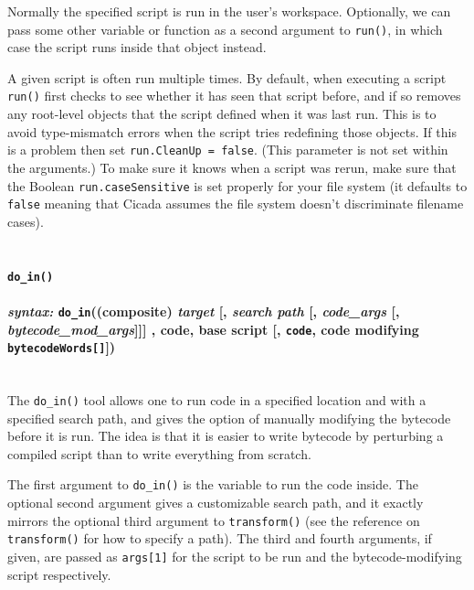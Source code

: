 \documentclass{article}
\begin{document}
Normally the specified script is run in the user's workspace.  Optionally, we can pass some other variable or function as a second argument to \texttt{run()}, in which case the script runs inside that object instead.

A given script is often run multiple times.  By default, when executing a script \verb#run()# first checks to see whether it has seen that script before, and if so removes any root-level objects that the script defined when it was last run.  This is to avoid type-mismatch errors when the script tries redefining those objects.  If this is a problem then set \verb#run.CleanUp = false#.  (This parameter is not set within the arguments.)  To make sure it knows when a script was rerun, make sure that the Boolean \verb#run.caseSensitive# is set properly for your file system (it defaults to \verb#false# meaning that Cicada assumes the file system doesn't discriminate filename cases).\\\\


\paragraph{\texttt{do\_in()}\\\\
\normalfont \emph{syntax: } \texttt{do\_in}((composite) \emph{target} [, \emph{search path} [, \emph{code\_args} [, \emph{bytecode\_mod\_args}]]] , code, base script [, \texttt{code}, code modifying \texttt{bytecodeWords[]}])\\\\}

The \verb#do_in()# tool allows one to run code in a specified location and with a specified search path, and gives the option of manually modifying the bytecode before it is run.  The idea is that it is easier to write bytecode by perturbing a compiled script than to write everything from scratch.

The first argument to \verb#do_in()# is the variable to run the code inside.  The optional second argument gives a customizable search path, and it exactly mirrors the optional third argument to \verb#transform()# (see the reference on \verb#transform()# for how to specify a path).  The third and fourth arguments, if given, are passed as \verb#args[1]# for the script to be run and the bytecode-modifying script respectively.
\end{document}
